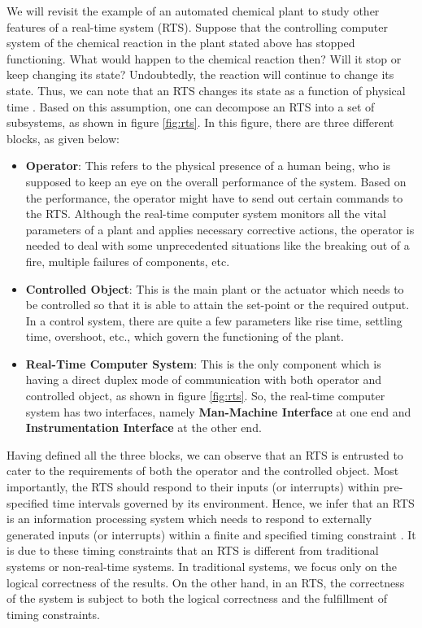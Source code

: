 \documentclass[12pt]{report}
\begin{document}
We will revisit the example of an automated chemical plant to study other features of a real-time system (RTS). Suppose that the controlling computer system of the chemical reaction in the plant stated above has stopped functioning. What would happen to the chemical reaction then? Will it stop or keep changing its state? Undoubtedly, the reaction will continue to change its state. Thus, we can note that an RTS changes its state as a function of physical time \cite{rts}. Based on this assumption, one can decompose an RTS into a set of subsystems, as shown in figure \ref{fig:rts}. In this figure, there are three different blocks, as given below:
\begin{itemize}
\item \textbf{Operator}: This refers to the physical presence of a human being, who is supposed to keep an eye on the overall performance of the system. Based on the performance, the operator might have to send out certain commands to the RTS. Although the real-time computer system monitors all the vital parameters of a plant and applies necessary corrective actions, the operator is needed to deal with some unprecedented situations like the breaking out of a fire, multiple failures of components, etc. 
\item \textbf{Controlled Object}: This is the main plant or the actuator which needs to be controlled so that it is able to attain the set-point or the required output. In a control system, there are quite a few parameters like rise time, settling time, overshoot, etc., which govern the functioning of the plant. 
\item \textbf{Real-Time Computer System}: This is the only component which is having a direct duplex mode of communication with both operator and controlled object, as shown in figure \ref{fig:rts}. So, the real-time computer system has two interfaces, namely \textbf{Man-Machine Interface} at one end and \textbf{Instrumentation Interface} at the other end. 
\end{itemize} 

Having defined all the three blocks, we can observe that an RTS is entrusted to cater to the requirements of both the operator and the controlled object. Most importantly, the RTS should respond to their inputs (or interrupts) within pre-specified time intervals governed by its environment. Hence, we infer that an RTS is an information processing system which needs to respond to externally generated inputs (or interrupts) within a finite and specified timing constraint \cite{unsw}. It is due to these timing constraints that an RTS is different from traditional systems or non-real-time systems. In traditional systems, we focus only on the logical correctness of the results. On the other hand, in an RTS, the correctness of the system is subject to both the logical correctness and the fulfillment of timing constraints. \\
\end{document}
